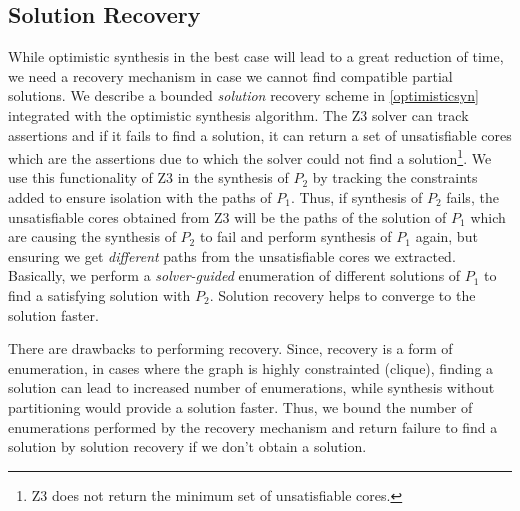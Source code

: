 \subsection{Solution Recovery}
While optimistic synthesis in the best case will lead to a great
reduction of time, we need a recovery mechanism in case we cannot find
compatible partial solutions.  We describe a bounded \emph{solution} recovery
scheme in \cref{optimisticsyn} integrated with the optimistic
synthesis algorithm.  The Z3 solver can track assertions and if it
fails to find a solution, it can return a set of unsatisfiable cores
which are the assertions due to which the solver could not find a
solution\footnote{Z3 does not return the minimum set of unsatisfiable
  cores.}.  We use this functionality of Z3 in the synthesis of $P_2$
by tracking the constraints added to ensure isolation with the paths
of $P_1$.  Thus, if synthesis of $P_2$ fails, the unsatisfiable cores
obtained from Z3 will be the paths of the solution of $P_1$ which are
causing the synthesis of $P_2$ to fail and perform synthesis of $P_1$
again, but ensuring we get \emph{different} paths from the
unsatisfiable cores we extracted.  Basically, we perform a 
\emph{solver-guided} enumeration of different solutions of $P_1$ to
find a satisfying solution with $P_2$.  Solution recovery helps to
converge to the solution faster. 

There are drawbacks to performing recovery. Since, recovery is a 
form of enumeration, in cases where the graph is highly constrainted
(clique), finding a solution can lead to increased number of enumerations,
while synthesis without partitioning would provide a solution faster. 
Thus, we bound the number of enumerations performed by the 
recovery mechanism and return failure to find a solution by solution recovery
if we don't obtain a solution. 

